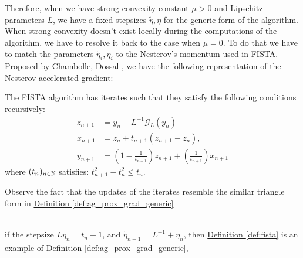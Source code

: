 \documentclass[12pt]{article}
\begin{document}
        \par
        Therefore, when we have strong convexity constant $\mu > 0$ and Lipschitz parameters $L$, we have a fixed stepsizes $\tilde \eta, \eta$ for the generic form of the algorithm. 
        When strong convexity doesn't exist locally during the computations of the algorithm, we have to resolve it back to the case when $\mu = 0$. 
        To do that we have to match the parameters $\tilde \eta_i, \eta_i$ to the Nesterov's momentum used in FISTA. 
        Proposed by Chambolle, Dossal \cite{chambolle_convergence_2015}, we have the following representation of the Nesterov accelerated gradient: 
        \begin{definition}[FISTA]\label{def:fista}
            The FISTA algorithm has iterates such that they satisfy the following conditions recursively: 
            \begin{align*}
                z_{n + 1} &= y_n - L^{-1}\mathcal G_L(y_n)
                \\
                x_{n + 1} &= z_n + t_{n +1} (z_{n + 1} - z_n), 
                \\
                y_{n + 1} &= \left(
                    1 - \frac{1}{t_{n + 1}}
                \right)z_{n + 1} + \left(
                    \frac{1}{t_{n + 1}}
                \right)x_{n + 1}
            \end{align*}
            where $(t_n)_{n\in \mathbb N}$ satisfies: $t_{n + 1}^2 - t_n^2 \le t_n$. 
        \end{definition}
        \begin{observation}
            Observe the fact that the updates of the iterates resemble the similar triangle form in
            \hyperref[def:ag_prox_grad_generic]{Definition \ref*{def:ag_prox_grad_generic}}
        \end{observation}
        \begin{theorem}
        \label{thm:fista_spacial_case_of_similar_triangle}
            \;\\
            if the stepsize $L\eta_n = t_n - 1$, and $\tilde \eta_{n + 1} = L^{-1} + \eta_n$, then
            \hyperref[def:fista]{Definition \ref*{def:fista}}
            is an example of 
            \hyperref[def:ag_prox_grad_generic]{Definition \ref*{def:ag_prox_grad_generic}}, 
        \end{theorem}
\end{document}
